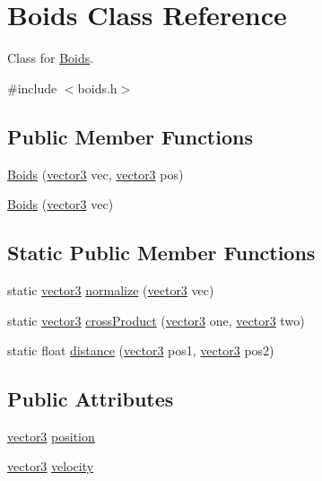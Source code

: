 \hypertarget{class_boids}{}\section{Boids Class Reference}
\label{class_boids}


Class for \mbox{\hyperlink{class_boids}{Boids}}.  




{\ttfamily \#include $<$boids.\+h$>$}

\subsection*{Public Member Functions}
\begin{DoxyCompactItemize}
\item 
\mbox{\hyperlink{class_boids_a1fb7df5a63ec953acef0991ff86efaf0}{Boids}} (\mbox{\hyperlink{structvector3}{vector3}} vec, \mbox{\hyperlink{structvector3}{vector3}} pos)
\item 
\mbox{\hyperlink{class_boids_a81e2977b6ddb93701445835858f3a8e8}{Boids}} (\mbox{\hyperlink{structvector3}{vector3}} vec)
\end{DoxyCompactItemize}
\subsection*{Static Public Member Functions}
\begin{DoxyCompactItemize}
\item 
static \mbox{\hyperlink{structvector3}{vector3}} \mbox{\hyperlink{class_boids_a97ba17ef16828cb7924b07fe05ce271f}{normalize}} (\mbox{\hyperlink{structvector3}{vector3}} vec)
\item 
static \mbox{\hyperlink{structvector3}{vector3}} \mbox{\hyperlink{class_boids_ae3185ab2d518aaf9ddd2133736ff8475}{cross\+Product}} (\mbox{\hyperlink{structvector3}{vector3}} one, \mbox{\hyperlink{structvector3}{vector3}} two)
\item 
static float \mbox{\hyperlink{class_boids_ac845eeac48654504d6fc4da90e680d88}{distance}} (\mbox{\hyperlink{structvector3}{vector3}} pos1, \mbox{\hyperlink{structvector3}{vector3}} pos2)
\end{DoxyCompactItemize}
\subsection*{Public Attributes}
\begin{DoxyCompactItemize}
\item 
\mbox{\hyperlink{structvector3}{vector3}} \mbox{\hyperlink{class_boids_a621fe5fcdebb76ebdb8df6286310c1c1}{position}}
\item 
\mbox{\hyperlink{structvector3}{vector3}} \mbox{\hyperlink{class_boids_a66fd56202c1a8acba0829d1e354dd9f2}{velocity}}
\end{DoxyCompactItemize}


